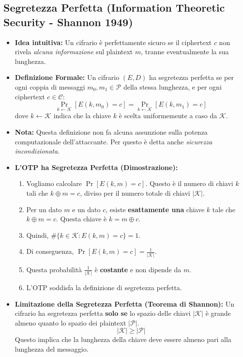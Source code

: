 \documentclass{article}
\begin{document}
\subsection{Segretezza Perfetta (Information Theoretic Security - Shannon 1949)}
\begin{itemize}
    \item \textbf{Idea intuitiva:} Un cifrario è perfettamente sicuro se il ciphertext $c$ non rivela \textit{alcuna informazione} sul plaintext $m$, tranne eventualmente la sua lunghezza.
    \item \textbf{Definizione Formale:} Un cifrario $(E, D)$ ha segretezza perfetta se per ogni coppia di messaggi $m_0, m_1 \in \mathcal{P}$ della stessa lunghezza, e per ogni ciphertext $c \in \mathcal{C}$:
    \[ \Pr_{k \leftarrow \mathcal{K}}[E(k, m_0) = c] = \Pr_{k \leftarrow \mathcal{K}}[E(k, m_1) = c] \]
    dove $k \leftarrow \mathcal{K}$ indica che la chiave $k$ è scelta uniformemente a caso da $\mathcal{K}$.
    \item \textbf{Nota:} Questa definizione non fa alcuna assunzione sulla potenza computazionale dell'attaccante. Per questo è detta anche \textit{sicurezza incondizionata}.
    \item \textbf{L'OTP ha Segretezza Perfetta (Dimostrazione):}
    \begin{enumerate}
        \item Vogliamo calcolare $\Pr[E(k, m) = c]$. Questo è il numero di chiavi $k$ tali che $k \oplus m = c$, diviso per il numero totale di chiavi $|\mathcal{K}|$.
        \item Per un dato $m$ e un dato $c$, esiste \textbf{esattamente una} chiave $k$ tale che $k \oplus m = c$. Questa chiave è $k = m \oplus c$.
        \item Quindi, $\#\{k \in \mathcal{K} : E(k,m) = c\} = 1$.
        \item Di conseguenza, $\Pr[E(k, m) = c] = \frac{1}{|\mathcal{K}|}$.
        \item Questa probabilità $\frac{1}{|\mathcal{K}|}$ è \textbf{costante} e non dipende da $m$.
        \item L'OTP soddisfa la definizione di segretezza perfetta.
    \end{enumerate}
    \item \textbf{Limitazione della Segretezza Perfetta (Teorema di Shannon):}
    Un cifrario ha segretezza perfetta \textbf{solo se} lo spazio delle chiavi $|\mathcal{K}|$ è grande almeno quanto lo spazio dei plaintext $|\mathcal{P}|$.
    \[ |\mathcal{K}| \geq |\mathcal{P}| \]
    Questo implica che la lunghezza della chiave deve essere almeno pari alla lunghezza del messaggio.
\end{itemize}
\end{document}
